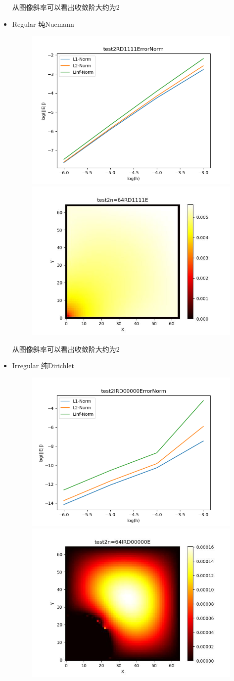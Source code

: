 \documentclass{article}
\begin{document}
\begin{itemize}
    从图像斜率可以看出收敛阶大约为2
    \newpage
    \item Regular 纯Nuemann
    \begin{figure}[h]
        \centering
        \includegraphics[width=0.35\linewidth]{test2RD1111ErrorNormjpg.png}
        \includegraphics[width=0.35\linewidth]{test2n=64RD1111E.jpg}
    \end{figure}

    从图像斜率可以看出收敛阶大约为2
    \item Irregular 纯Dirichlet
    \begin{figure}[h]
        \centering
        \includegraphics[width=0.35\linewidth]{test2IRD00000ErrorNormjpg.png}
        \includegraphics[width=0.35\linewidth]{test2n=64IRD00000E.jpg}
    \end{figure}


\end{itemize}
\end{document}
